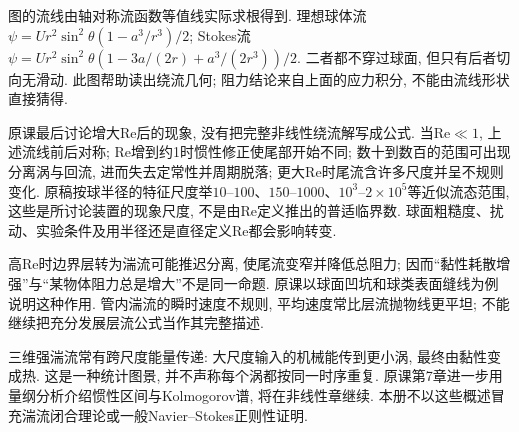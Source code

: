 
图的流线由轴对称流函数等值线实际求根得到. 理想球体流$\psi=Ur^2\sin^2\theta(1-a^3/r^3)/2$; Stokes流$\psi=Ur^2\sin^2\theta(1-3a/(2r)+a^3/(2r^3))/2$. 二者都不穿过球面, 但只有后者切向无滑动. 此图帮助读出绕流几何; 阻力结论来自上面的应力积分, 不能由流线形状直接猜得.

原课最后讨论增大Re后的现象, 没有把完整非线性绕流解写成公式. 当$\mathrm{Re}\ll1$, 上述流线前后对称; Re增到约1时惯性修正使尾部开始不同; 数十到数百的范围可出现分离涡与回流, 进而失去定常性并周期脱落; 更大Re时尾流含许多尺度并呈不规则变化. 原稿按球半径的特征尺度举$10$--$100$、$150$--$1000$、$10^3$--$2\times10^5$等近似流态范围, 这些是所讨论装置的现象尺度, 不是由Re定义推出的普适临界数. 球面粗糙度、扰动、实验条件及用半径还是直径定义Re都会影响转变.

高Re时边界层转为湍流可能推迟分离, 使尾流变窄并降低总阻力; 因而“黏性耗散增强”与“某物体阻力总是增大”不是同一命题. 原课以球面凹坑和球类表面缝线为例说明这种作用. 管内湍流的瞬时速度不规则, 平均速度常比层流抛物线更平坦; 不能继续把充分发展层流公式当作其完整描述.

三维强湍流常有跨尺度能量传递: 大尺度输入的机械能传到更小涡, 最终由黏性变成热. 这是一种统计图景, 并不声称每个涡都按同一时序重复. 原课第7章进一步用量纲分析介绍惯性区间与Kolmogorov谱, 将在非线性章继续. 本册不以这些概述冒充湍流闭合理论或一般Navier--Stokes正则性证明.
